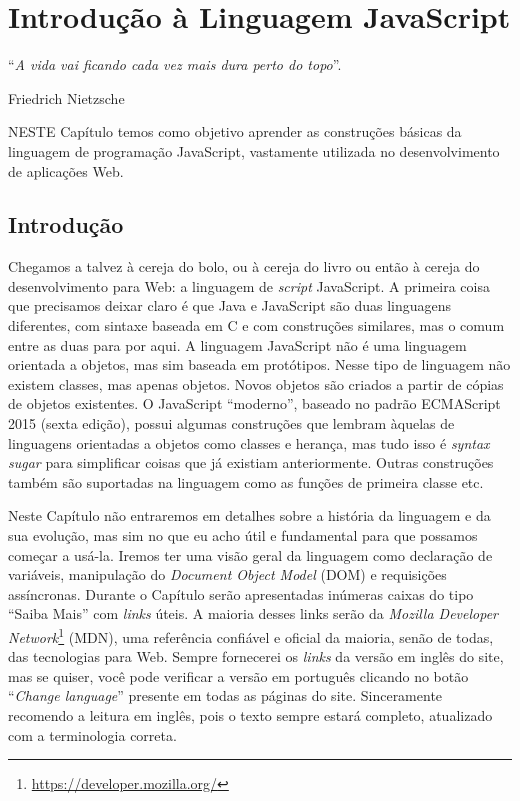 \chapter{Introdução à Linguagem JavaScript}\label{cap:javaScript}
\epigraph{``\textit{A vida vai ficando cada vez mais dura perto do topo}''.}{Friedrich Nietzsche}

\lettrine[lines=4, lhang=0.1, lraise=0, loversize=0.2, findent=0.1em]{\textcolor{corTema}{N}}{ESTE} Capítulo temos como objetivo aprender as construções básicas da linguagem de programação JavaScript, vastamente utilizada no desenvolvimento de aplicações Web.

\section{Introdução}

Chegamos a talvez à cereja do bolo, ou à cereja do livro ou então à cereja do desenvolvimento para Web: a linguagem de \textit{script} JavaScript. A primeira coisa que precisamos deixar claro é que Java e JavaScript são duas linguagens diferentes, com sintaxe baseada em C e com construções similares, mas o comum entre as duas para por aqui. A linguagem JavaScript não é uma linguagem orientada a objetos, mas sim baseada em protótipos. Nesse tipo de linguagem não existem classes, mas apenas objetos. Novos objetos são criados a partir de cópias de objetos existentes. O JavaScript ``moderno'', baseado no padrão ECMAScript 2015 (sexta edição), possui algumas construções que lembram àquelas de linguagens orientadas a objetos como classes e herança, mas tudo isso é \textit{syntax sugar} para simplificar coisas que já existiam anteriormente. Outras construções também são suportadas na linguagem como as funções de primeira classe etc.

Neste Capítulo não entraremos em detalhes sobre a história da linguagem e da sua evolução, mas sim no que eu acho útil e fundamental para que possamos começar a usá-la. Iremos ter uma visão geral da linguagem como declaração de variáveis, manipulação do \textit{Document Object Model} (DOM) e requisições assíncronas. Durante o Capítulo serão apresentadas inúmeras caixas do tipo ``Saiba Mais'' com \textit{links} úteis. A maioria desses links serão da \textit{Mozilla Developer Network}\footnote{\url{https://developer.mozilla.org/}} (MDN), uma referência confiável e oficial da maioria, senão de todas, das tecnologias para Web. Sempre fornecerei os \textit{links} da versão em inglês do site, mas se quiser, você pode verificar a versão em português clicando no botão ``\textit{Change language}'' presente em todas as páginas do site. Sinceramente recomendo a leitura em inglês, pois o texto sempre estará completo, atualizado com a terminologia correta.

